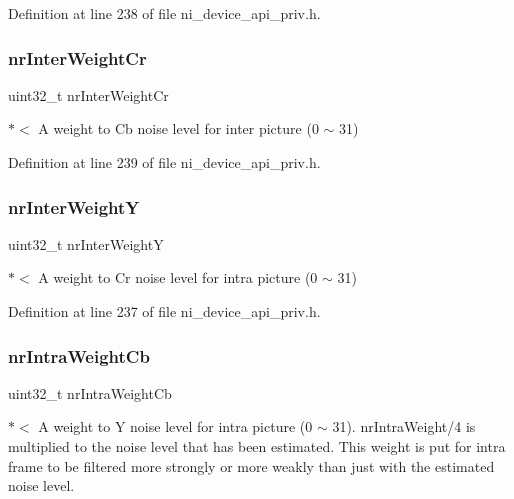Definition at line 238 of file ni\+\_\+device\+\_\+api\+\_\+priv.\+h.

\mbox{\label{struct__ni__t408__config__t_a74f5c8aec093eefb24e8c81971f560ab}} 
\subsubsection{\texorpdfstring{nrInterWeightCr}{nrInterWeightCr}}
{\footnotesize\ttfamily uint32\+\_\+t nr\+Inter\+Weight\+Cr}

$\ast$$<$ A weight to Cb noise level for inter picture (0 $\sim$ 31) 

Definition at line 239 of file ni\+\_\+device\+\_\+api\+\_\+priv.\+h.

\mbox{\label{struct__ni__t408__config__t_a572ab28c94c7239c17d6ff712f24b892}} 
\subsubsection{\texorpdfstring{nrInterWeightY}{nrInterWeightY}}
{\footnotesize\ttfamily uint32\+\_\+t nr\+Inter\+WeightY}

$\ast$$<$ A weight to Cr noise level for intra picture (0 $\sim$ 31) 

Definition at line 237 of file ni\+\_\+device\+\_\+api\+\_\+priv.\+h.

\mbox{\label{struct__ni__t408__config__t_aa8a865dc5d4a14ca3ca0dcd73f7b8613}} 
\subsubsection{\texorpdfstring{nrIntraWeightCb}{nrIntraWeightCb}}
{\footnotesize\ttfamily uint32\+\_\+t nr\+Intra\+Weight\+Cb}

$\ast$$<$ A weight to Y noise level for intra picture (0 $\sim$ 31). nr\+Intra\+Weight/4 is multiplied to the noise level that has been estimated. This weight is put for intra frame to be filtered more strongly or more weakly than just with the estimated noise level. 

